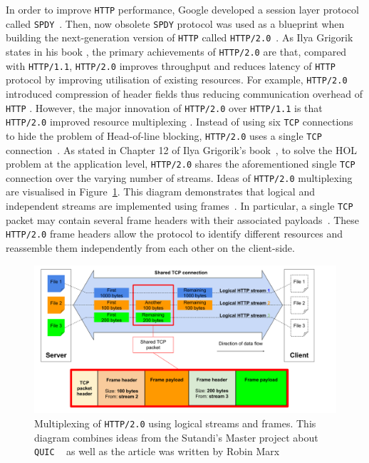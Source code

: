 \documentclass[12pt,a4paper,twoside,openright]{report}
\begin{document}
In order to improve \texttt{HTTP} performance, Google developed a session layer protocol called \texttt{SPDY}~\cite{bib_SPDY_white_paper}.
Then, now obsolete \texttt{SPDY} protocol was used as a blueprint when building the next-generation version of \texttt{HTTP} called \texttt{HTTP/2.0}~\cite{bib_SPDY_vs_HTTP2}.
As Ilya Grigorik states in his book \cite[Chapter~12]{bib_grigorik2013}, the primary achievements of \texttt{HTTP/2.0} are that, compared with \texttt{HTTP/1.1}, \texttt{HTTP/2.0} improves throughput and reduces latency of \texttt{HTTP} protocol by improving utilisation of existing resources.
For example, \texttt{HTTP/2.0} introduced compression of header fields thus reducing communication overhead of \texttt{HTTP} \cite[Chapter~12]{bib_grigorik2013}.
However, the major innovation of \texttt{HTTP/2.0} over \texttt{HTTP/1.1} is that \texttt{HTTP/2.0} improved resource multiplexing \cite[Chapter~12]{bib_grigorik2013}.
Instead of using six \texttt{TCP} connections to hide the problem of Head-of-line blocking, \texttt{HTTP/2.0} uses a single \texttt{TCP} connection~\cite{bib_grigorik2013, head-of-line-blocking-in-quic-and-http-3-the-details}.
As stated in Chapter 12 of Ilya Grigorik's book~\cite{bib_grigorik2013}, to solve the HOL problem at the application level, \texttt{HTTP/2.0} shares the aforementioned single \texttt{TCP} connection over the varying number of streams.
Ideas of \texttt{HTTP/2.0} multiplexing are visualised in Figure~\ref{fig:Multiplexing_HTTP2}.
This diagram demonstrates that logical and independent streams are implemented using frames~\cite{head-of-line-blocking-in-quic-and-http-3-the-details}.
In particular, a single \texttt{TCP} packet may contain several frame headers with their associated payloads~\cite{head-of-line-blocking-in-quic-and-http-3-the-details}.
These \texttt{HTTP/2.0} frame headers allow the protocol to identify different resources and reassemble them independently from each other on the client-side.

    \begin{figure}[H]
    \centering
    \includegraphics[width=\textwidth]{figs/Multiplexing_HTTP2.png}
    \caption[Multiplexing of \texttt{HTTP/2.0} using logical streams and frames]{Multiplexing of \texttt{HTTP/2.0} using logical streams and frames. This diagram combines ideas from the Sutandi's Master project about \texttt{QUIC}
   ~\cite{overview_of_the_QUIC_protocol}
    as well as the article was written by Robin Marx~\cite{head-of-line-blocking-in-quic-and-http-3-the-details}}
    \label{fig:Multiplexing_HTTP2}
    \end{figure}
    
\end{document}
